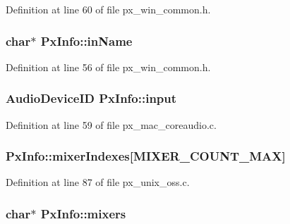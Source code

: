Definition at line 60 of file px\+\_\+win\+\_\+common.\+h.

\subsubsection[{\texorpdfstring{in\+Name}{inName}}]{\setlength{\rightskip}{0pt plus 5cm}char$\ast$ Px\+Info\+::in\+Name}\hypertarget{struct_px_info_a708d007c96ed790b0ca6e1630bb5229a}{}\label{struct_px_info_a708d007c96ed790b0ca6e1630bb5229a}


Definition at line 56 of file px\+\_\+win\+\_\+common.\+h.

\subsubsection[{\texorpdfstring{input}{input}}]{\setlength{\rightskip}{0pt plus 5cm}Audio\+Device\+ID Px\+Info\+::input}\hypertarget{struct_px_info_a8285612dd16519bfe8bac5b81f02a7e1}{}\label{struct_px_info_a8285612dd16519bfe8bac5b81f02a7e1}


Definition at line 59 of file px\+\_\+mac\+\_\+coreaudio.\+c.

\subsubsection[{\texorpdfstring{mixer\+Indexes}{mixerIndexes}}]{ Px\+Info\+::mixer\+Indexes\mbox{[}{\bf M\+I\+X\+E\+R\+\_\+\+C\+O\+U\+N\+T\+\_\+\+M\+AX}\mbox{]}}\hypertarget{struct_px_info_a5a077bf933573ec7022f220d92a9ad13}{}\label{struct_px_info_a5a077bf933573ec7022f220d92a9ad13}


Definition at line 87 of file px\+\_\+unix\+\_\+oss.\+c.

\subsubsection[{\texorpdfstring{mixers}{mixers}}]{\setlength{\rightskip}{0pt plus 5cm}char$\ast$ Px\+Info\+::mixers}\hypertarget{struct_px_info_a99ac87bf9f934ade5ee528c70109cdaa}{}\label{struct_px_info_a99ac87bf9f934ade5ee528c70109cdaa}


